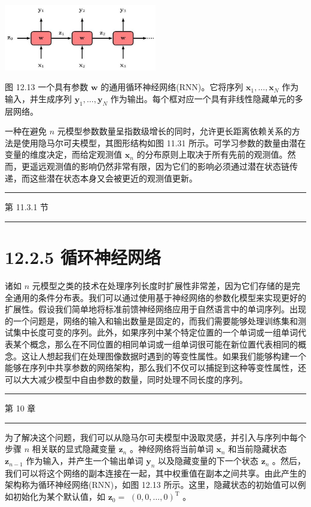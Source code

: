 \documentclass[10pt]{article}
\newcommand{\HRule}{\begin{center}\rule{0.9\linewidth}{0.2mm}\end{center}}
\begin{document}
\begin{center}
\includegraphics[max width=0.5\textwidth]{images/0194e279-9b28-703a-88f4-c3ac21e2010d_399_843_363_710_309_0.jpg}
\end{center}
\hspace*{3em} 

图 12.13 一个具有参数 \(\mathbf{w}\) 的通用循环神经网络(RNN)。它将序列 \({\mathbf{x}}_{1},\ldots ,{\mathbf{x}}_{N}\) 作为输入，并生成序列 \({\mathbf{y}}_{1},\ldots ,{\mathbf{y}}_{N}\) 作为输出。每个框对应一个具有非线性隐藏单元的多层网络。

一种在避免 \(n\) 元模型参数数量呈指数级增长的同时，允许更长距离依赖关系的方法是使用隐马尔可夫模型，其图形结构如图 11.31 所示。可学习参数的数量由潜在变量的维度决定，而给定观测值 \({\mathbf{x}}_{n}\) 的分布原则上取决于所有先前的观测值。然而，更遥远观测值的影响仍然非常有限，因为它们的影响必须通过潜在状态链传递，而这些潜在状态本身又会被更近的观测值更新。

\HRule

第 11.3.1 节

\HRule

\section*{12.2.5 循环神经网络}

诸如 \(n\) 元模型之类的技术在处理序列长度时扩展性非常差，因为它们存储的是完全通用的条件分布表。我们可以通过使用基于神经网络的参数化模型来实现更好的扩展性。假设我们简单地将标准前馈神经网络应用于自然语言中的单词序列。出现的一个问题是，网络的输入和输出数量是固定的，而我们需要能够处理训练集和测试集中长度可变的序列。此外，如果序列中某个特定位置的一个单词或一组单词代表某个概念，那么在不同位置的相同单词或一组单词很可能在新位置代表相同的概念。这让人想起我们在处理图像数据时遇到的等变性属性。如果我们能够构建一个能够在序列中共享参数的网络架构，那么我们不仅可以捕捉到这种等变性属性，还可以大大减少模型中自由参数的数量，同时处理不同长度的序列。

\HRule

第 10 章

\HRule

为了解决这个问题，我们可以从隐马尔可夫模型中汲取灵感，并引入与序列中每个步骤 \(n\) 相关联的显式隐藏变量 \({\mathbf{z}}_{n}\) 。神经网络将当前单词 \({\mathbf{x}}_{n}\) 和当前隐藏状态 \({\mathbf{z}}_{n - 1}\) 作为输入，并产生一个输出单词 \({\mathbf{y}}_{n}\) 以及隐藏变量的下一个状态 \({\mathbf{z}}_{n}\) 。然后，我们可以将这个网络的副本连接在一起，其中权重值在副本之间共享。由此产生的架构称为循环神经网络(RNN)，如图 12.13 所示。这里，隐藏状态的初始值可以例如初始化为某个默认值，如 \({\mathbf{z}}_{0} =\)  \({\left( 0,0,\ldots ,0\right) }^{\mathrm{T}}\) 。
\end{document}

